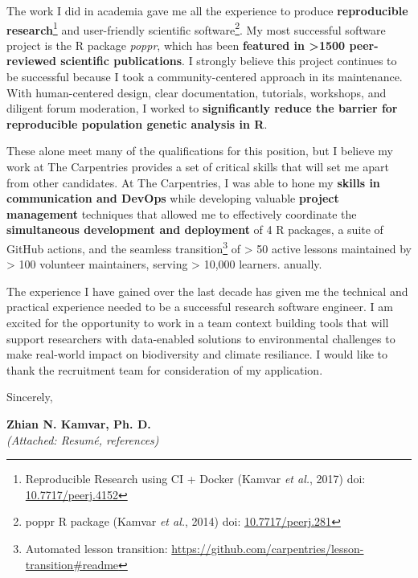 \vspace{2ex}

The work I did in academia gave me all the experience to produce 
\textbf{reproducible research}\footnote{Reproducible Research using CI + Docker (Kamvar \textit{et al.}, 2017) doi: \href{https://doi.org/10.7717/peerj.4152}{10.7717/peerj.4152}}
and user-friendly scientific software\footnote{poppr R package (Kamvar \textit{et al.}, 2014) doi: \href{https://doi.org/10.7717/peerj.281}{10.7717/peerj.281}}.
My most successful software project is the R package
\textit{poppr}, which has been \textbf{featured in \textgreater1500
peer-reviewed scientific publications}. I strongly believe this project
continues to be successful because I took a community-centered approach in its
maintenance. With human-centered design, clear documentation, tutorials,
workshops, and diligent forum moderation, I worked to \textbf{significantly
reduce the barrier for reproducible population genetic analysis in R}.

\vspace{2ex}

These alone meet many of the qualifications for this position, but I believe my
work at The Carpentries provides a set of critical skills that will set me
apart from other candidates. At The Carpentries, I was able to hone my
\textbf{skills in communication and DevOps} while developing valuable
\textbf{project management} techniques that allowed me to effectively
coordinate the \textbf{simultaneous development and deployment} of 4 R
packages, a suite of GitHub actions, and the seamless transition\footnote{Automated lesson transition: \url{https://github.com/carpentries/lesson-transition\#readme}}
of > 50 active lessons maintained by > 100 volunteer maintainers, serving >
10,000 learners. anually. 

\vspace{2ex}

The experience I have gained over the last decade has given me the technical and
practical experience needed to be a successful research software engineer. I am
excited for the opportunity to work in a team context building tools that will
support researchers with data-enabled solutions to environmental challenges to
make real-world impact on biodiversity and climate resiliance. I would like to
thank the recruitment team for consideration of my application.

\vspace{3ex}

Sincerely,

\vspace{4ex}

\textbf{Zhian N. Kamvar, Ph. D.}\\
{\footnotesize \textit{(Attached: Resum\'{e}, references)}}

\clearpage



